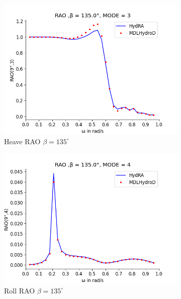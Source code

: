 \begin{figure}[H]
\begin{subfigure}[b]{0.49\textwidth}
        \includegraphics[width=\textwidth]{plots/kcs/rao2/rao3.png}
        \caption{Heave RAO $\beta = 135^{\circ}$}
    \end{subfigure}
    \begin{subfigure}[b]{0.49\textwidth}
        \includegraphics[width=\textwidth]{plots/kcs/rao2/rao4.png}
        \caption{Roll RAO $\beta = 135^{\circ}$}
    \end{subfigure}
    \vspace{5pt}%
    \begin{subfigure}[b]{0.49\textwidth}

\end{subfigure}
\end{figure}
